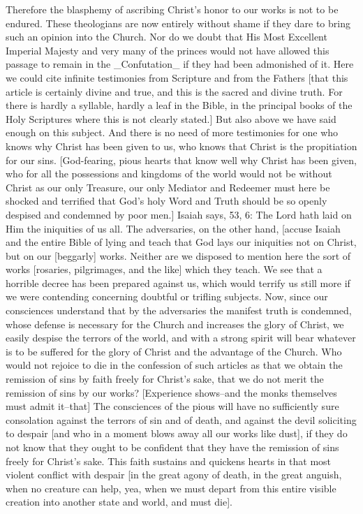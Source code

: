 Therefore the blasphemy of ascribing Christ's honor to our works is
not to be endured.  These theologians are now entirely without shame
if they dare to bring such an opinion into the Church.  Nor do we
doubt that His Most Excellent Imperial Majesty and very many of the
princes would not have allowed this passage to remain in the
_Confutation_ if they had been admonished of it.  Here we could cite
infinite testimonies from Scripture and from the Fathers [that this
article is certainly divine and true, and this is the sacred and
divine truth.  For there is hardly a syllable, hardly a leaf in the
Bible, in the principal books of the Holy Scriptures where this is
not clearly stated.] But also above we have said enough on this
subject.  And there is no need of more testimonies for one who knows
why Christ has been given to us, who knows that Christ is the
propitiation for our sins.  [God-fearing, pious hearts that know well
why Christ has been given, who for all the possessions and kingdoms
of the world would not be without Christ as our only Treasure, our
only Mediator and Redeemer must here be shocked and terrified that
God's holy Word and Truth should be so openly despised and condemned
by poor men.] Isaiah says, 53, 6: The Lord hath laid on Him the
iniquities of us all.  The adversaries, on the other hand, [accuse
Isaiah and the entire Bible of lying and teach that God lays our
iniquities not on Christ, but on our [beggarly] works.  Neither are
we disposed to mention here the sort of works [rosaries, pilgrimages,
and the like] which they teach.  We see that a horrible decree has
been prepared against us, which would terrify us still more if we
were contending concerning doubtful or trifling subjects.  Now, since
our consciences understand that by the adversaries the manifest truth
is condemned, whose defense is necessary for the Church and increases
the glory of Christ, we easily despise the terrors of the world, and
with a strong spirit will bear whatever is to be suffered for the
glory of Christ and the advantage of the Church.  Who would not
rejoice to die in the confession of such articles as that we obtain
the remission of sins by faith freely for Christ's sake, that we do
not merit the remission of sins by our works?  [Experience shows--and
the monks themselves must admit it--that] The consciences of the
pious will have no sufficiently sure consolation against the terrors
of sin and of death, and against the devil soliciting to despair [and
who in a moment blows away all our works like dust], if they do not
know that they ought to be confident that they have the remission of
sins freely for Christ's sake.  This faith sustains and quickens
hearts in that most violent conflict with despair [in the great agony
of death, in the great anguish, when no creature can help, yea, when
we must depart from this entire visible creation into another state
and world, and must die].


